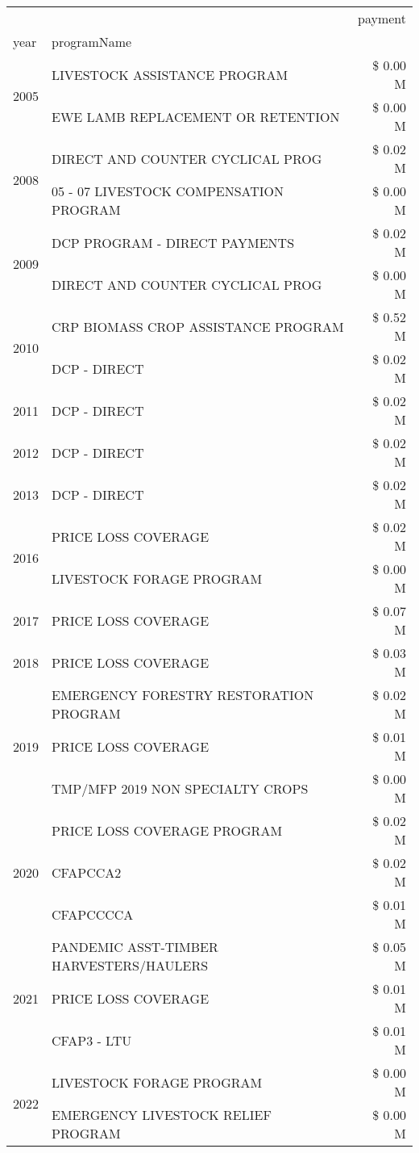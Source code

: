 \begin{tabular}{llr}
\toprule
 &  & payment \\
year & programName &  \\
\midrule
\multirow[t]{2}{*}{2005} & LIVESTOCK ASSISTANCE PROGRAM & \$ 0.00 M \\
 & EWE LAMB REPLACEMENT OR RETENTION & \$ 0.00 M \\
\cline{1-3}
\multirow[t]{2}{*}{2008} & DIRECT AND COUNTER CYCLICAL PROG & \$ 0.02 M \\
 & 05 - 07 LIVESTOCK COMPENSATION PROGRAM & \$ 0.00 M \\
\cline{1-3}
\multirow[t]{2}{*}{2009} & DCP PROGRAM - DIRECT PAYMENTS & \$ 0.02 M \\
 & DIRECT AND COUNTER CYCLICAL PROG & \$ 0.00 M \\
\cline{1-3}
\multirow[t]{2}{*}{2010} & CRP BIOMASS CROP ASSISTANCE PROGRAM & \$ 0.52 M \\
 & DCP - DIRECT & \$ 0.02 M \\
\cline{1-3}
2011 & DCP - DIRECT & \$ 0.02 M \\
\cline{1-3}
2012 & DCP - DIRECT & \$ 0.02 M \\
\cline{1-3}
2013 & DCP - DIRECT & \$ 0.02 M \\
\cline{1-3}
\multirow[t]{2}{*}{2016} & PRICE LOSS COVERAGE & \$ 0.02 M \\
 & LIVESTOCK FORAGE PROGRAM & \$ 0.00 M \\
\cline{1-3}
2017 & PRICE LOSS COVERAGE & \$ 0.07 M \\
\cline{1-3}
2018 & PRICE LOSS COVERAGE & \$ 0.03 M \\
\cline{1-3}
\multirow[t]{3}{*}{2019} & EMERGENCY FORESTRY RESTORATION PROGRAM & \$ 0.02 M \\
 & PRICE LOSS COVERAGE & \$ 0.01 M \\
 & TMP/MFP 2019 NON SPECIALTY CROPS & \$ 0.00 M \\
\cline{1-3}
\multirow[t]{3}{*}{2020} & PRICE LOSS COVERAGE PROGRAM & \$ 0.02 M \\
 & CFAPCCA2 & \$ 0.02 M \\
 & CFAPCCCCA & \$ 0.01 M \\
\cline{1-3}
\multirow[t]{3}{*}{2021} & PANDEMIC ASST-TIMBER HARVESTERS/HAULERS & \$ 0.05 M \\
 & PRICE LOSS COVERAGE & \$ 0.01 M \\
 & CFAP3 - LTU & \$ 0.01 M \\
\cline{1-3}
\multirow[t]{2}{*}{2022} & LIVESTOCK FORAGE PROGRAM & \$ 0.00 M \\
 & EMERGENCY LIVESTOCK RELIEF PROGRAM & \$ 0.00 M \\
\cline{1-3}
\bottomrule
\end{tabular}
